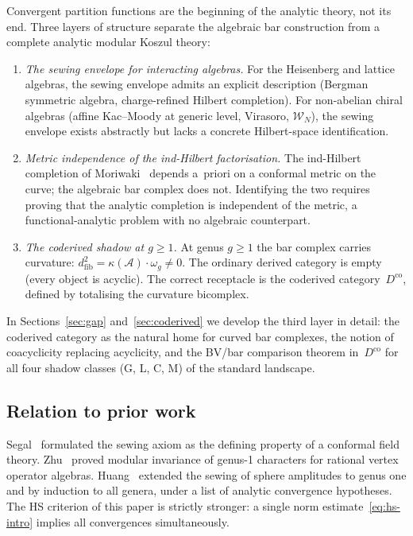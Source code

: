 \documentclass[11pt,reqno]{amsart}
\theoremstyle{definition}
\theoremstyle{remark}
\newcommand{\cA}{\mathcal{A}}
\newcommand{\cW}{\mathcal{W}}
\newcommand{\Dco}{D^{\mathrm{co}}}
\numberwithin{equation}{section}
\begin{document}
Convergent partition functions are the beginning of the analytic
theory, not its end.  Three layers of structure separate the
algebraic bar construction from a complete analytic modular
Koszul theory:
\begin{enumerate}[label=\textup{(\arabic*)}]
\item \emph{The sewing envelope for interacting algebras.}
 For the Heisenberg and lattice algebras, the sewing envelope
 admits an explicit description (Bergman symmetric algebra,
 charge-refined Hilbert completion).  For non-abelian chiral
 algebras (affine Kac--Moody at generic level, Virasoro,
 $\cW_N$), the sewing envelope exists abstractly but lacks a
 concrete Hilbert-space identification.
\item \emph{Metric independence of the ind-Hilbert
 factorisation.}  The ind-Hilbert completion of
 Moriwaki~\cite{Moriwaki26b} depends a~priori on a conformal
 metric on the curve; the algebraic bar complex does not.
 Identifying the two requires proving that the analytic
 completion is independent of the metric, a functional-analytic
 problem with no algebraic counterpart.
\item \emph{The coderived shadow at $g \geq 1$.}  At genus
 $g \geq 1$ the bar complex carries curvature:
 $d_{\mathrm{fib}}^2 = \kappa(\cA) \cdot \omega_g \neq 0$.
 The ordinary derived category is empty (every object is
 acyclic).  The correct receptacle is the coderived
 category~$\Dco$, defined by totalising the curvature bicomplex.
\end{enumerate}

In Sections~\ref{sec:gap} and~\ref{sec:coderived} we develop
the third layer in detail: the coderived category as the natural
home for curved bar complexes, the notion of coacyclicity
replacing acyclicity, and the BV/bar comparison theorem in~$\Dco$
for all four shadow classes (G, L, C, M) of the standard landscape.

\subsection{Relation to prior work}\label{subsec:prior}

Segal~\cite{Segal88} formulated the sewing axiom as the
defining property of a conformal field theory.
Zhu~\cite{Zhu96} proved modular invariance of genus-1 characters
for rational vertex operator algebras.
Huang~\cite{Huang05} extended the sewing of sphere amplitudes
to genus one and by induction to all genera, under a list of
analytic convergence hypotheses.  The HS criterion of this paper
is strictly stronger: a single norm
estimate~\eqref{eq:hs-intro} implies all convergences
simultaneously.
\end{document}
